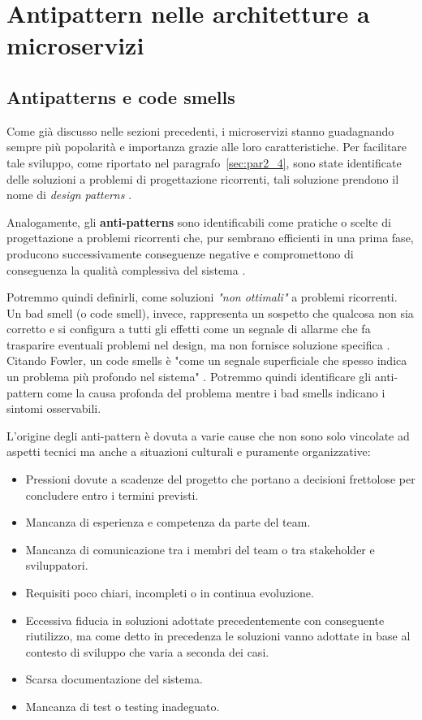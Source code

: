 \chapter{Antipattern nelle architetture a microservizi}



\section{Antipatterns e code smells}
Come già discusso nelle sezioni precedenti, i microservizi stanno guadagnando sempre più popolarità e importanza grazie alle loro caratteristiche. Per facilitare tale sviluppo, come riportato nel paragrafo~\ref{sec:par2_4}, sono state identificate delle soluzioni a problemi di progettazione ricorrenti, tali soluzione prendono il nome di \textit{design patterns} \cite{CernyCatalogo}.

Analogamente, gli \textbf{anti-patterns} sono identificabili come pratiche o scelte di progettazione a problemi ricorrenti che, pur sembrano efficienti in una prima fase, producono successivamente conseguenze negative e compromettono di conseguenza la qualità complessiva del sistema \cite{CernyCatalogo}.

Potremmo quindi definirli, come soluzioni \textit{"non ottimali"} a problemi ricorrenti. Un bad smell (o code smell), invece, rappresenta un sospetto che qualcosa non sia corretto e si configura a tutti gli effetti come un segnale di allarme che fa trasparire eventuali problemi nel design, ma non fornisce soluzione specifica \cite{CernyCatalogo}.
Citando Fowler, un code smells è "come un segnale superficiale che spesso indica un problema più profondo nel sistema" \cite{fowler_codesmell}.
Potremmo quindi identificare gli anti-pattern come la causa profonda del problema mentre i bad smells indicano i sintomi osservabili. 

L'origine degli anti-pattern è dovuta a varie cause che non sono solo vincolate ad aspetti tecnici ma anche a situazioni culturali e puramente organizzative:
\begin{itemize}
    \item Pressioni dovute a scadenze del progetto che portano a decisioni frettolose per concludere entro i termini previsti. 
    \item Mancanza di esperienza e competenza da parte del team.
    \item Mancanza di comunicazione tra i membri del team o tra stakeholder e sviluppatori. 
    \item Requisiti poco chiari, incompleti o in continua evoluzione. 
    \item Eccessiva fiducia in soluzioni adottate precedentemente con conseguente riutilizzo, ma come detto in precedenza le soluzioni vanno adottate in base al contesto di sviluppo che varia a seconda dei casi. 
    \item Scarsa documentazione del sistema. 
    \item Mancanza di test o testing inadeguato. 
\end{itemize}

